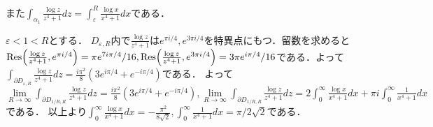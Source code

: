 \documentclass[
		book,
		head_space=20mm,
		foot_space=20mm,
		gutter=10mm,
		line_length=190mm
]{jlreq}
\begin{document}
また$\int_{\alpha_1} \frac{\log z}{z^4+1}dz = \int_{\varepsilon}^R \frac{\log x}{x^4+1}dx$である．

$\varepsilon<1<R$とする．
$D_{\varepsilon,R}$内で$\frac{\log z}{z^4+1}$は$e^{\pi i/4},e^{3\pi i/4}$を特異点にもつ．留数を求めると$\Res(\frac{\log z}{z^4+1},e^{\pi i/4})=\pi e^{7i\pi/4}/16,\Res(\frac{\log z}{z^4+1},e^{3\pi i/4})=3\pi  e^{i\pi /4}/16$である．よって
$\int_{\partial D_{\varepsilon,R}} \frac{\log z}{z^4+1}dz = \frac{i\pi^2}{8}(3e^{i\pi/4}+e^{-i\pi/4})$である．
よって$\lim\limits_{R\rightarrow\infty}\int_{\partial D_{1/R,R}}  \frac{\log z }{z^4+1}dz=\frac{i\pi^2}{8}(3e^{i\pi/4}+e^{-i\pi/4}),\lim\limits_{R \rightarrow \infty}\int_{\partial D_{1/R,R}} \frac{\log z}{z^4+1}dz=2 \int_0^\infty \frac{\log x}{x^4+1}dx + \pi i \int_0^\infty \frac{1}{x^4+1}dx$である．
以上より$\int_0^\infty \frac{\log x}{x^4+1}dx = -\frac{\pi^2}{8\sqrt{2}},\int_0^\infty \frac{1}{x^4+1}dx =\pi/2\sqrt{2}$である．
\end{document}

